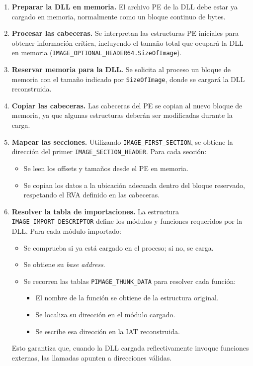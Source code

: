 \begin{enumerate}
    \item \textbf{Preparar la DLL en memoria.}  
    El archivo PE de la DLL debe estar ya cargado en memoria, normalmente como un bloque continuo de bytes.

    \item \textbf{Procesar las cabeceras.}  
    Se interpretan las estructuras PE iniciales para obtener información crítica, incluyendo el tamaño total que ocupará la DLL en memoria (\texttt{IMAGE\_OPTIONAL\_HEADER64.SizeOfImage}).

    \item \textbf{Reservar memoria para la DLL.}  
    Se solicita al proceso un bloque de memoria con el tamaño indicado por \texttt{SizeOfImage}, donde se cargará la DLL reconstruida.

    \item \textbf{Copiar las cabeceras.}  
    Las cabeceras del PE se copian al nuevo bloque de memoria, ya que algunas estructuras deberán ser modificadas durante la carga.

    \item \textbf{Mapear las secciones.}  
    Utilizando \texttt{IMAGE\_FIRST\_SECTION}, se obtiene la dirección del primer \texttt{IMAGE\_SECTION\_HEADER}.  
    Para cada sección:
    \begin{itemize}
        \item Se leen los offsets y tamaños desde el PE en memoria.
        \item Se copian los datos a la ubicación adecuada dentro del bloque reservado, respetando el RVA definido en las cabeceras.
    \end{itemize}

    \item \textbf{Resolver la tabla de importaciones.}  
    La estructura \texttt{IMAGE\_IMPORT\_DESCRIPTOR} define los módulos y funciones requeridos por la DLL.  
    Para cada módulo importado:
    \begin{itemize}
        \item Se comprueba si ya está cargado en el proceso; si no, se carga.
        \item Se obtiene su \textit{base address}.
        \item Se recorren las tablas \texttt{PIMAGE\_THUNK\_DATA} para resolver cada función:
        \begin{itemize}
            \item El nombre de la función se obtiene de la estructura original.
            \item Se localiza su dirección en el módulo cargado.
            \item Se escribe esa dirección en la IAT reconstruida.
        \end{itemize}
    \end{itemize}
    Esto garantiza que, cuando la DLL cargada reflectivamente invoque funciones externas, las llamadas apunten a direcciones válidas.


\end{enumerate}
